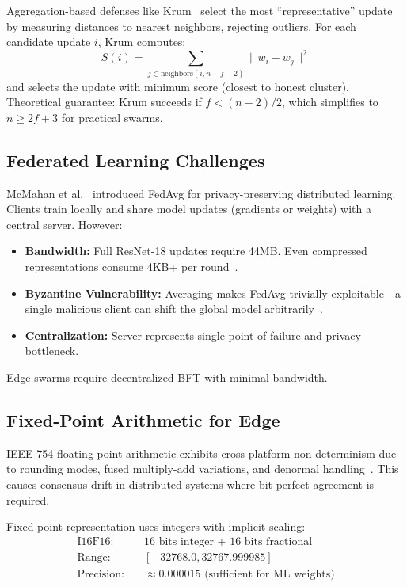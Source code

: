 \documentclass[conference,10pt]{IEEEtran}
\begin{document}
Aggregation-based defenses like Krum~\cite{blanchard2017machine} select the most ``representative'' update by measuring distances to nearest neighbors, rejecting outliers. For each candidate update $i$, Krum computes:
\begin{equation}
S(i) = \sum_{j \in \text{neighbors}(i, n-f-2)} \|w_i - w_j\|^2
\end{equation}
and selects the update with minimum score (closest to honest cluster). Theoretical guarantee: Krum succeeds if $f < (n-2)/2$, which simplifies to $n \geq 2f + 3$ for practical swarms.

\subsection{Federated Learning Challenges}
McMahan et al.~\cite{mcmahan2017communication} introduced FedAvg for privacy-preserving distributed learning. Clients train locally and share model updates (gradients or weights) with a central server. However:
\begin{itemize}
    \item \textbf{Bandwidth:} Full ResNet-18 updates require 44MB. Even compressed representations consume 4KB+ per round~\cite{alistarh2017qsgd}.
    \item \textbf{Byzantine Vulnerability:} Averaging makes FedAvg trivially exploitable---a single malicious client can shift the global model arbitrarily~\cite{bagdasaryan2020backdoor}.
    \item \textbf{Centralization:} Server represents single point of failure and privacy bottleneck.
\end{itemize}
Edge swarms require decentralized BFT with minimal bandwidth.

\subsection{Fixed-Point Arithmetic for Edge}
IEEE 754 floating-point arithmetic exhibits cross-platform non-determinism due to rounding modes, fused multiply-add variations, and denormal handling~\cite{goldberg1991every}. This causes consensus drift in distributed systems where bit-perfect agreement is required.

Fixed-point representation uses integers with implicit scaling:
\begin{align*}
\text{I16F16:} & \quad \text{16 bits integer + 16 bits fractional} \\
\text{Range:} & \quad [-32768.0, 32767.999985] \\
\text{Precision:} & \quad \approx 0.000015 \text{ (sufficient for ML weights)}
\end{align*}
\end{document}
